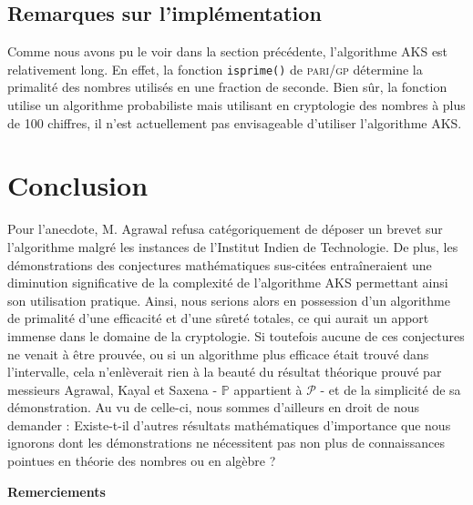 \documentclass[11pt]{article}
\begin{document}
\subsection{Remarques sur l'implémentation}

Comme nous avons pu le voir dans la section précédente, l'algorithme AKS est relativement long. En effet, la fonction \texttt{isprime()} de \textsc{pari/gp} détermine la primalité des nombres utilisés en une fraction de seconde. Bien sûr, la fonction utilise un algorithme probabiliste mais utilisant en cryptologie des nombres à plus de 100 chiffres, il n'est actuellement pas envisageable d'utiliser l'algorithme AKS.

\newpage


\section{Conclusion}

Pour l'anecdote, M. Agrawal refusa catégoriquement de déposer un brevet sur l'algorithme malgré les instances de l'Institut Indien de Technologie. De plus, les démonstrations des conjectures mathématiques sus-citées entraîneraient une diminution significative de la complexité de l'algorithme AKS permettant ainsi son utilisation pratique. Ainsi, nous serions alors en possession d'un algorithme de primalité d'une efficacité et d'une sûreté totales, ce qui aurait un apport immense dans le domaine de la cryptologie. Si toutefois aucune de ces conjectures ne venait à être prouvée, ou si un algorithme plus efficace était trouvé dans l'intervalle, cela n'enlèverait rien à la beauté du résultat théorique prouvé par messieurs Agrawal, Kayal et Saxena - $\mathbb{P}$ appartient à  $\mathcal{P}$ - et de la simplicité de sa démonstration. 
Au vu de celle-ci, nous sommes d'ailleurs en droit de nous demander : Existe-t-il d'autres résultats mathématiques d'importance que nous ignorons dont les démonstrations ne nécessitent pas non plus de connaissances pointues en théorie des nombres ou en algèbre ?

\newpage

\begin{center}
\begin{Large}
\textbf{Remerciements}
\end{Large}
\end{center}
\end{document}
